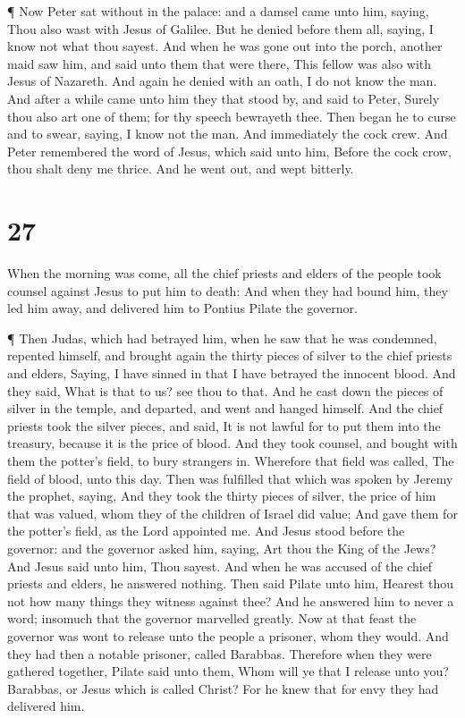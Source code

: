  ¶ Now Peter sat without in the palace: and a damsel came
unto him, saying, Thou also wast with Jesus of Galilee. 
But he denied before them all, saying, I know not what thou sayest.
 And when he was gone out into the porch, another maid saw
him, and said unto them that were there, This fellow was also with Jesus
of Nazareth.  And again he denied with an oath, I do not
know the man.  And after a while came unto him they that
stood by, and said to Peter, Surely thou also art one of them; for thy
speech bewrayeth thee.  Then began he to curse and to
swear, saying, I know not the man. And immediately the cock crew.
 And Peter remembered the word of Jesus, which said unto
him, Before the cock crow, thou shalt deny me thrice. And he went out,
and wept bitterly.

\hypertarget{section-26}{%
\section{27}\label{section-26}}

 When the morning was come, all the chief priests and elders
of the people took counsel against Jesus to put him to death:
 And when they had bound him, they led him away, and
delivered him to Pontius Pilate the governor.

 ¶ Then Judas, which had betrayed him, when he saw that he
was condemned, repented himself, and brought again the thirty pieces of
silver to the chief priests and elders,  Saying, I have
sinned in that I have betrayed the innocent blood. And they said, What
is that to us? see thou to that.  And he cast down the
pieces of silver in the temple, and departed, and went and hanged
himself.  And the chief priests took the silver pieces, and
said, It is not lawful for to put them into the treasury, because it is
the price of blood.  And they took counsel, and bought with
them the potter's field, to bury strangers in.  Wherefore
that field was called, The field of blood, unto this day. 
Then was fulfilled that which was spoken by Jeremy the prophet, saying,
And they took the thirty pieces of silver, the price of him that was
valued, whom they of the children of Israel did value;  And
gave them for the potter's field, as the Lord appointed me.
 And Jesus stood before the governor: and the governor
asked him, saying, Art thou the King of the Jews? And Jesus said unto
him, Thou sayest.  And when he was accused of the chief
priests and elders, he answered nothing.  Then said Pilate
unto him, Hearest thou not how many things they witness against thee?
 And he answered him to never a word; insomuch that the
governor marvelled greatly.  Now at that feast the governor
was wont to release unto the people a prisoner, whom they would.
 And they had then a notable prisoner, called Barabbas.
 Therefore when they were gathered together, Pilate said
unto them, Whom will ye that I release unto you? Barabbas, or Jesus
which is called Christ?  For he knew that for envy they had
delivered him.

